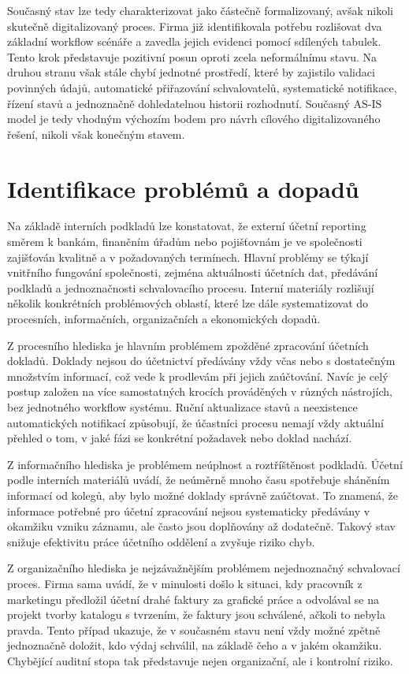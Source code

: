 Současný stav lze tedy charakterizovat jako částečně formalizovaný, avšak nikoli skutečně digitalizovaný proces. Firma již identifikovala potřebu rozlišovat dva základní workflow scénáře a zavedla jejich evidenci pomocí sdílených tabulek. Tento krok představuje pozitivní posun oproti zcela neformálnímu stavu. Na druhou stranu však stále chybí jednotné prostředí, které by zajistilo validaci povinných údajů, automatické přiřazování schvalovatelů, systematické notifikace, řízení stavů a jednoznačně dohledatelnou historii rozhodnutí. Současný AS-IS model je tedy vhodným výchozím bodem pro návrh cílového digitalizovaného řešení, nikoli však konečným stavem.


\section{Identifikace problémů a dopadů}

Na základě interních podkladů lze konstatovat, že externí účetní reporting směrem k bankám, finančním úřadům nebo pojišťovnám je ve společnosti zajišťován kvalitně a v požadovaných termínech. Hlavní problémy se týkají vnitřního fungování společnosti, zejména aktuálnosti účetních dat, předávání podkladů a jednoznačnosti schvalovacího procesu. Interní materiály rozlišují několik konkrétních problémových oblastí, které lze dále systematizovat do procesních, informačních, organizačních a ekonomických dopadů.

Z procesního hlediska je hlavním problémem zpožděné zpracování účetních dokladů. Doklady nejsou do účetnictví předávány vždy včas nebo s dostatečným množstvím informací, což vede k prodlevám při jejich zaúčtování. Navíc je celý postup založen na více samostatných krocích prováděných v různých nástrojích, bez jednotného workflow systému. Ruční aktualizace stavů a neexistence automatických notifikací způsobují, že účastníci procesu nemají vždy aktuální přehled o tom, v jaké fázi se konkrétní požadavek nebo doklad nachází.

Z informačního hlediska je problémem neúplnost a roztříštěnost podkladů. Účetní podle interních materiálů uvádí, že neúměrně mnoho času spotřebuje sháněním informací od kolegů, aby bylo možné doklady správně zaúčtovat. To znamená, že informace potřebné pro účetní zpracování nejsou systematicky předávány v okamžiku vzniku záznamu, ale často jsou doplňovány až dodatečně. Takový stav snižuje efektivitu práce účetního oddělení a zvyšuje riziko chyb.

Z organizačního hlediska je nejzávažnějším problémem nejednoznačný schvalovací proces. Firma sama uvádí, že v minulosti došlo k situaci, kdy pracovník z marketingu předložil účetní drahé faktury za grafické práce a odvolával se na projekt tvorby katalogu s tvrzením, že faktury jsou schválené, ačkoli to nebyla pravda. Tento případ ukazuje, že v současném stavu není vždy možné zpětně jednoznačně doložit, kdo výdaj schválil, na základě čeho a v jakém okamžiku. Chybějící auditní stopa tak představuje nejen organizační, ale i kontrolní riziko.

